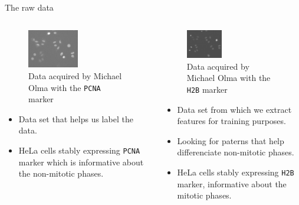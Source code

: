 \documentclass{beamer}
\begin{document}
\begin{frame}{The raw data}
\begin{columns}[T] %
\begin{column}{.40\textwidth}
\begin{footnotesize}
\begin{figure}[!ht]
\centering
\includegraphics[width=0.50\textwidth]{Images/PCNA.png}
\caption{Data acquired by Michael Olma with the \texttt{PCNA} marker}
\label{PCNA_michael_olma}
\end{figure}


\begin{itemize}
\item Data set that helps us label the data.
\item HeLa cells stably expressing \texttt{PCNA} marker which is informative about the non-mitotic phases.
\end{itemize}
\end{footnotesize}

\end{column}%

\hfill%

\begin{column}{.56\textwidth}
\begin{footnotesize}
\begin{figure}[!ht]
\centering
\includegraphics[width=0.38\textwidth]{Images/H2B.png}
\caption{Data acquired by Michael Olma with the \texttt{H2B} marker}
\label{H2B}
\end{figure}


\begin{itemize}
\item Data set from which we extract features for training purposes. 
\item Looking for paterns that help differenciate non-mitotic phases.
\item HeLa cells stably expressing \texttt{H2B} marker, informative about the mitotic phases.
\end{itemize}
\end{footnotesize}

\end{column}%

\end{columns}


\end{frame}
\end{document}
